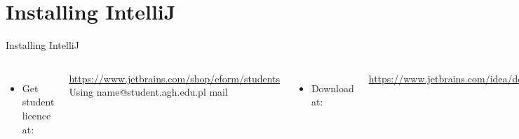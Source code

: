 \documentclass[aspectratio=1610,english]{beamer} %
\begin{document}
	\section{Installing IntelliJ}
	\begin{frame}{Installing IntelliJ}
		\begin{columns}
				\begin{itemize}
					\small
					\color{black}
					\item Get student licence at:
				\end{itemize}
				\tiny
				\url{https://www.jetbrains.com/shop/eform/students} \\
				Using name@student.agh.edu.pl mail 
				\begin{itemize}
					\small
					\color{black}
					\item Download at:
				\end{itemize}
				\tiny
				\url{https://www.jetbrains.com/idea/download/} \\
				\begin{itemize}
					\small
					\color{black}
					\item Extract -$>$ Run ./idea.sh:
					\item To create shortcut \\
						Open a terminal and go to
				\end{itemize}
				\tiny
				/extracted\textunderscore to\textunderscore path/idea/bin
				\begin{itemize}
					\small
					\color{black}
					\item On my computer it is in 
				\end{itemize}
				\tiny 
				$\sim$/home/IdeaUI-install/bin
				\begin{itemize}
					\small
					\color{black}
					\item Start IntelliJ with ./idea.sh.
					\item Tools -$>$ Generate Desktop Entry.
					\item Close IntelliJ.
					\item In the terminal, start nautilus as admin
				\end{itemize}
				\tiny 
				sudo nautilus
				\begin{itemize}
					\small
					\color{black}
					\item Go to /usr/share/applications.
					\item Drag IntelliJ's icon to your desktop \\ 

\end{itemize}
\end{columns}
\end{frame}
\end{document}
